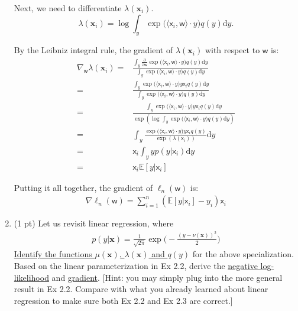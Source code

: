 \documentclass[10pt]{article}
\newcommand{\xv}{\mathbf{x}}
\newcommand{\inner}[2]{\langle #1, #2 \rangle}
\newcommand{\xbs}{\bm{\mathsf{x}}}
\newcommand{\wbs}{\bm{\mathsf{w}}}
\begin{document}
\begin{exercise}
\begin{enumerate}
          Next, we need to differentiate $\lambda(\xv_i)$.
          $$
            \lambda(\xv_i) = \log \int_y \exp\big( \inner{\xbs_i}{\wbs} \cdot y \big) q(y) \mathrm{d} y.
          $$

          By the Leibniz integral rule, the gradient of $\lambda(\xv_i)$ with respect to $\wbs$ is:
          \begin{equation*}
            \begin{aligned}
              \nabla_{\wbs} \lambda(\xv_i) = & \frac{\int_y \frac{\partial}{\partial\wbs}\exp\big( \inner{\xbs_i}{\wbs} \cdot y \big)  q(y) \mathrm{d} y}{\int_y \exp\big( \inner{\xbs_i}{\wbs} \cdot y \big) q(y) \mathrm{d} y} \\
              =                              & \frac{\int_y \exp\big( \inner{\xbs_i}{\wbs} \cdot y \big) y \xbs_i q(y) \mathrm{d} y}{\int_y \exp\big( \inner{\xbs_i}{\wbs} \cdot y \big) q(y) \mathrm{d} y}                      \\
              =                              & \frac{\int_y \exp\big( \inner{\xbs_i}{\wbs} \cdot y \big) y \xbs_i q(y) \mathrm{d} y}{\exp(\log\int_y \exp\big( \inner{\xbs_i}{\wbs} \cdot y \big) q(y) \mathrm{d} y)}            \\
              =                              & \int_y \frac{\exp\big( \inner{\xbs_i}{\wbs} \cdot y \big) y \xbs_i q(y)}{\exp(\lambda(\xbs_i))} \mathrm{d} y                                                                      \\
              =                              & \xbs_i\int_y yp(y| \xbs_i)\mathrm{d} y                                                                                                                                            \\
              =                              & \xbs_i\mathbb{E}[y | \xbs_i]
            \end{aligned}
          \end{equation*}

          Putting it all together, the gradient of $\ell_n(\wbs)$ is:
          \begin{align}
            \boxed{\nabla \ell_n(\wbs) = \sum_{i=1}^n  ( \mathbb{E}[y  | \xbs_i]-y_i)\xbs_i}
          \end{align}

          \newpage
    \item (1 pt) Let us revisit linear regression, where
          \begin{align}
            p(y | \xv) =\tfrac{1}{\sqrt{2\pi}}\exp\big(-\tfrac{(y - \nu(\xv))^2}{2}\big)
          \end{align}
          \uline{Identify the functions $\mu(\xv)$, $\lambda(\xv)$ and $q(y)$} for the above specialization. Based on the linear parameterization in Ex 2.2, derive the \uline{negative log-likelihood} and \uline{gradient}. [Hint: you may simply plug into the more general result in Ex 2.2. Compare with what you already learned about linear regression to make sure both Ex 2.2 and Ex 2.3 are correct.]


\end{enumerate}
\end{exercise}
\end{document}
